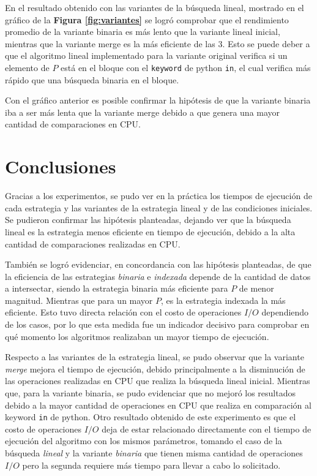\documentclass[11pt]{article}
\begin{document}
En el resultado obtenido con las variantes de la búsqueda lineal, mostrado en el gráfico de la \textbf{Figura \ref{fig:variantes}} se logró comprobar que el rendimiento promedio de la variante binaria es más lento que la variante lineal inicial, mientras que la variante merge es la más eficiente de las 3. Esto se puede deber a que el algoritmo lineal implementado para la variante original verifica si un elemento de $P$ está en el bloque con el \texttt{keyword} de python \texttt{in}, el cual verifica más rápido que una búsqueda binaria en el bloque. 

Con el gráfico anterior es posible confirmar la hipótesis de que la variante binaria iba a ser más lenta que la variante merge debido a que genera una mayor cantidad de comparaciones en CPU.

\newpage
\section{Conclusiones}

Gracias a los experimentos, se pudo ver en la práctica los tiempos de ejecución de cada estrategia y las variantes de la estrategia lineal y de las condiciones iniciales. Se pudieron confirmar las hipótesis planteadas, dejando ver que la búsqueda lineal es la estrategia menos eficiente en tiempo de ejecución, debido a la alta cantidad de comparaciones realizadas en CPU. 

También se logró evidenciar, en concordancia con las hipótesis planteadas, de que la eficiencia de las estrategias \textit{binaria} e \textit{indexada} depende de la cantidad de datos a intersectar, siendo la estrategia binaria más eficiente para $P$ de menor magnitud. Mientras que para un mayor $P$, es la estrategia indexada la más eficiente. Esto tuvo directa relación con el costo de operaciones $I/O$ dependiendo de los casos, por lo que esta medida fue un indicador decisivo para comprobar en qué momento los algoritmos realizaban un mayor tiempo de ejecución.

Respecto a las variantes de la estrategia lineal, se pudo observar que la variante \textit{merge} mejora el tiempo de ejecución, debido principalmente a la disminución de las operaciones realizadas en CPU que realiza la búsqueda lineal inicial. Mientras que, para la variante binaria, se pudo evidenciar que no mejoró los resultados debido a la mayor cantidad de operaciones en CPU que realiza en comparación al keyword \texttt{in} de python.
Otro resultado obtenido de este experimento es que el costo de operaciones $I/O$ deja de estar relacionado directamente con el tiempo de ejecución del algoritmo con los mismos parámetros, tomando el caso de la búsqueda \textit{lineal} y la variante \textit{binaria} que tienen misma cantidad de operaciones $I/O$ pero la segunda requiere más tiempo para llevar a cabo lo solicitado.
\end{document}
